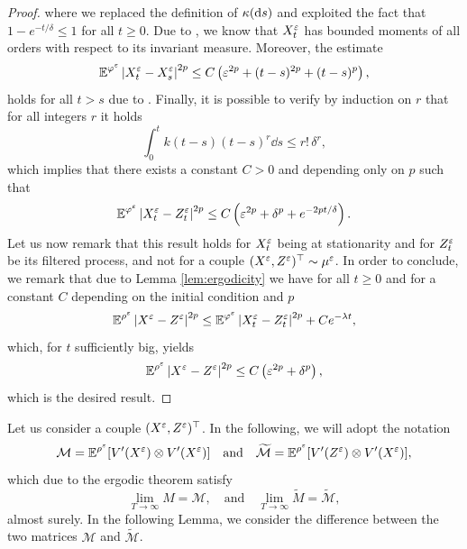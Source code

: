 \documentclass[10pt]{article}
\begin{document}
\begin{proof}
	where we replaced the definition of $\kappa(\mathrm{d} s)$ and exploited the fact that $1 - e^{-t/\delta}\leq 1$ for all $t \geq 0$. Due to \cite[Corollary 5.4]{PaS07}, we know that $X^\varepsilon_t$ has bounded moments of all orders with respect to its invariant measure. Moreover, the estimate
	\begin{equation}
		\operatorname{\mathbb{E}}^{\varphi^\varepsilon}\left\lvert X_t^\varepsilon - X_s^\varepsilon\right\rvert^{2p} \leq C\left(\varepsilon^{2p} + (t-s)^{2p} + (t-s)^p\right),
	\end{equation}
	holds for all $t > s$ due to \cite[Lemma 6.1]{PaS07}. Finally, it is possible to verify by induction on $r$ that for all integers $r$ it holds
	\begin{equation}
		\int_0^t k(t-s) (t - s)^r \dd s \leq r! \, \delta^r, 
	\end{equation}
	which implies that there exists a constant $C > 0$ and depending only on $p$ such that
	\begin{equation}
		\operatorname{\mathbb{E}}^{\varphi^\varepsilon}\left\lvert X_t^\varepsilon - Z_t^\varepsilon\right\rvert^{2p} \leq C\left(\varepsilon^{2p} + \delta^p + e^{-2pt/\delta}\right).
	\end{equation}
	Let us now remark that this result holds for $X_t^\varepsilon$ being at stationarity and for $Z_t^\varepsilon$ be its filtered process, and not for a couple $(X^\varepsilon, Z^\varepsilon)^\top \sim \mu^\varepsilon$. In order to conclude, we remark that due to Lemma \ref{lem:ergodicity} we have for all $t \geq 0$ and for a constant $C$ depending on the initial condition and $p$  
	\begin{equation}
		\operatorname{\mathbb{E}}^{\rho^\varepsilon} \left\lvert X^\varepsilon - Z^\varepsilon\right\rvert^{2p} \leq \operatorname{\mathbb{E}}^{\varphi^\varepsilon}\left\lvert X_t^\varepsilon - Z_t^\varepsilon\right\rvert^{2p} + Ce^{-\lambda t},
	\end{equation}
	which, for $t$ sufficiently big, yields
	\begin{equation}
		\operatorname{\mathbb{E}}^{\rho^\varepsilon} \left\lvert X^\varepsilon - Z^\varepsilon\right\rvert^{2p} \leq C\left(\varepsilon^{2p} + \delta^p\right),
	\end{equation}
	which is the desired result.
\end{proof}

Let us consider a couple $(X^\varepsilon, Z^\varepsilon)^\top$. In the following, we will adopt the notation
\begin{equation}\label{eq:CalM}
	\mathcal M = \operatorname{\mathbb{E}}^{\rho^\varepsilon}[V'(X^\varepsilon) \otimes V'(X^\varepsilon)] \quad \text{and} \quad \widetilde{\mathcal M} = \operatorname{\mathbb{E}}^{\rho^\varepsilon}[V'(Z^\varepsilon) \otimes V'(X^\varepsilon)],
\end{equation}
which due to the ergodic theorem satisfy
\begin{equation}
	\lim_{T \to \infty} M = \mathcal M, \quad \text{and} \quad \lim_{T \to \infty} \widetilde M = \mathcal{\widetilde M},
\end{equation}
almost surely. In the following Lemma, we consider the difference between the two matrices $\mathcal M$ and $\widetilde{\mathcal M}$.
\end{document}
